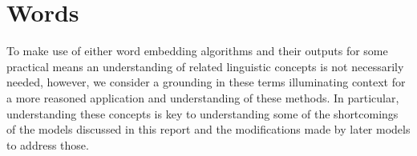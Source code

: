 \chapter{Words}
To make use of either word embedding algorithms and their outputs for some practical means an understanding of related linguistic concepts is not necessarily needed, however, we consider a grounding in these terms illuminating context for a more reasoned application and understanding of these methods. In particular, understanding these concepts is key to understanding some of the shortcomings of the models discussed in this report and the modifications made by later models to address those.




